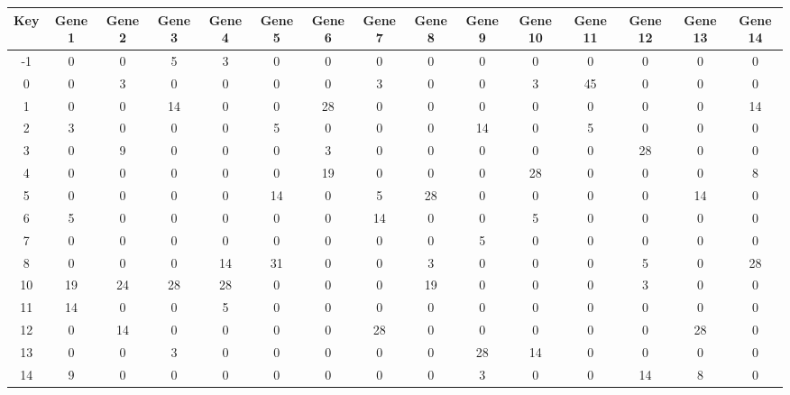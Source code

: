 \begin{tabular}{|c|c|c|c|c|c|c|c|c|c|c|c|c|c|c|}
\hline
Key & Gene 1 & Gene 2 & Gene 3 & Gene 4 & Gene 5 & Gene 6 & Gene 7 & Gene 8 & Gene 9 & Gene 10 & Gene 11 & Gene 12 & Gene 13 & Gene 14 \\
\hline
-1 & 0 & 0 & 5 & 3 & 0 & 0 & 0 & 0 & 0 & 0 & 0 & 0 & 0 & 0 \\
0 & 0 & 3 & 0 & 0 & 0 & 0 & 3 & 0 & 0 & 3 & 45 & 0 & 0 & 0 \\
1 & 0 & 0 & 14 & 0 & 0 & 28 & 0 & 0 & 0 & 0 & 0 & 0 & 0 & 14 \\
2 & 3 & 0 & 0 & 0 & 5 & 0 & 0 & 0 & 14 & 0 & 5 & 0 & 0 & 0 \\
3 & 0 & 9 & 0 & 0 & 0 & 3 & 0 & 0 & 0 & 0 & 0 & 28 & 0 & 0 \\
4 & 0 & 0 & 0 & 0 & 0 & 19 & 0 & 0 & 0 & 28 & 0 & 0 & 0 & 8 \\
5 & 0 & 0 & 0 & 0 & 14 & 0 & 5 & 28 & 0 & 0 & 0 & 0 & 14 & 0 \\
6 & 5 & 0 & 0 & 0 & 0 & 0 & 14 & 0 & 0 & 5 & 0 & 0 & 0 & 0 \\
7 & 0 & 0 & 0 & 0 & 0 & 0 & 0 & 0 & 5 & 0 & 0 & 0 & 0 & 0 \\
8 & 0 & 0 & 0 & 14 & 31 & 0 & 0 & 3 & 0 & 0 & 0 & 5 & 0 & 28 \\
10 & 19 & 24 & 28 & 28 & 0 & 0 & 0 & 19 & 0 & 0 & 0 & 3 & 0 & 0 \\
11 & 14 & 0 & 0 & 5 & 0 & 0 & 0 & 0 & 0 & 0 & 0 & 0 & 0 & 0 \\
12 & 0 & 14 & 0 & 0 & 0 & 0 & 28 & 0 & 0 & 0 & 0 & 0 & 28 & 0 \\
13 & 0 & 0 & 3 & 0 & 0 & 0 & 0 & 0 & 28 & 14 & 0 & 0 & 0 & 0 \\
14 & 9 & 0 & 0 & 0 & 0 & 0 & 0 & 0 & 3 & 0 & 0 & 14 & 8 & 0 \\
\hline
\end{tabular}